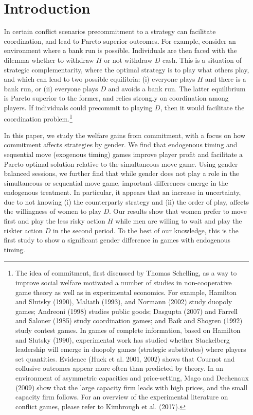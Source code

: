 \documentclass[11pt, letterpaper]{article}
\theoremstyle{plain}
\begin{document}
\section{Introduction}
\label{sec:intro}









In certain conflict scenarios precommitment to a strategy can facilitate coordination, and lead to Pareto superior outcomes. For example, consider an environment where a bank run is possible. Individuals are then faced with the dilemma whether to withdraw $H$ or not withdraw $D$ cash. This is a situation of strategic complementarity, where the optimal strategy is to play what others play, and which can lead to two possible equilibria: (i) everyone plays $H$ and there is a bank run, or (ii) everyone plays $D$ and avoids a bank run. The latter equilibrium is Pareto superior to the former, and relies strongly on coordination among players. If individuals could precommit to playing $D$, then it would facilitate the coordination problem.\footnote{The idea of commitment, first discussed by Thomas Schelling,  as a way to improve social welfare motivated a number of studies in non-cooperative game theory as well as in experimental economics. For example, Hamilton and Slutsky (1990), Maliath (1993),  and Normann (2002) study duopoly games; Andreoni (1998) studies public goods;  Dasgupta (2007) and Farrell and Saloner (1985) study coordination games; and Baik and Shogren (1992) study contest games. In games of complete information, based on Hamilton and Slutsky (1990), experimental work has studied whether Stackelberg leadership will emerge in duopoly games (strategic substitutes) where players set quantities. Evidence (Huck et al. 2001, 2002) shows that Cournot and collusive outcomes appear more often than predicted by theory. In an environment of asymmetric capacities and price-setting, Mago and Dechenaux (2009) show that the large capacity firm leads with high prices, and the small capacity firm follows. For an overview of the experimental literature on conflict games, please refer to Kimbrough et  al. (2017). } 


In this paper, we study the welfare gains from commitment, with a focus on how commitment affects strategies by gender. We find that endogenous timing and sequential move (exogenous timing) games improve player profit and facilitate a Pareto
optimal solution relative to the simultaneous move game. Using gender balanced sessions, we further find that while gender does not play a role in the simultaneous or sequential move game, important differences emerge in the endogenous treatment. In particular, it appears that an increase in uncertainty, due to not knowing (i) the counterparty strategy and (ii) the order of play, affects the willingness of women to play $D$. Our results show that women prefer to move first and play the less risky action $H$ while men are willing to wait and play the riskier action $D$ in the second period. To the best of our knowledge, this is the first study to show a significant gender difference in games with endogenous timing. 
\end{document}
